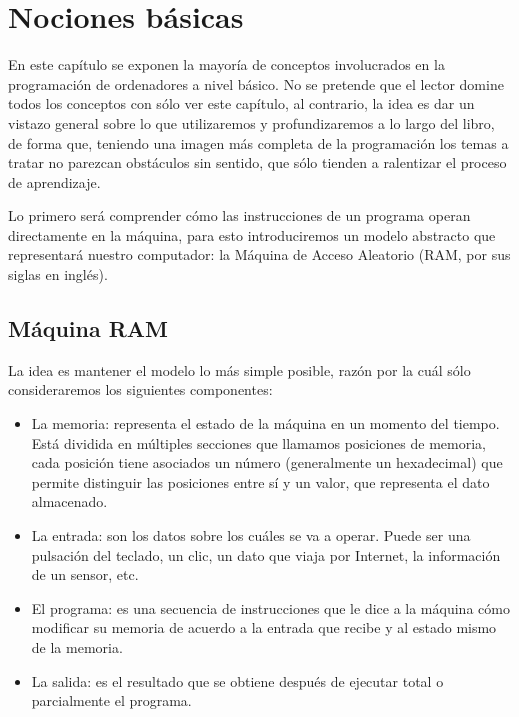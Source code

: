 \chapter{Nociones básicas}

En este capítulo se exponen la mayoría de conceptos involucrados en la programación de ordenadores a nivel básico. No se pretende que el lector domine todos los conceptos con sólo ver este capítulo, al contrario, la idea es dar un vistazo general sobre lo que utilizaremos y profundizaremos a lo largo del libro, de forma que, teniendo una imagen más completa de la programación los temas a tratar no parezcan obstáculos sin sentido, que sólo tienden a ralentizar el proceso de aprendizaje. 

Lo primero será comprender cómo las instrucciones de un programa operan directamente en la máquina, para esto introduciremos un modelo abstracto que representará nuestro computador: la Máquina de Acceso Aleatorio (RAM, por sus siglas en inglés).

\section{Máquina RAM}

La idea es mantener el modelo lo más simple posible, razón por la cuál sólo consideraremos los siguientes componentes:

\begin{itemize}
\item La memoria: representa el estado de la máquina en un momento del tiempo. Está dividida en múltiples secciones que llamamos posiciones de memoria, cada posición tiene asociados un número (generalmente un hexadecimal) que permite distinguir las posiciones entre sí y un valor, que representa el dato almacenado.

\item La entrada: son los datos sobre los cuáles se va a operar. Puede ser una pulsación del teclado, un clic, un dato que viaja por Internet, la información de un sensor, etc.
 
\item El programa: es una secuencia de instrucciones que le dice a la máquina cómo modificar su memoria de acuerdo a la entrada que recibe y al estado mismo de la memoria. 

\item La salida: es el resultado que se obtiene después de ejecutar total o parcialmente el programa.
\end{itemize}


